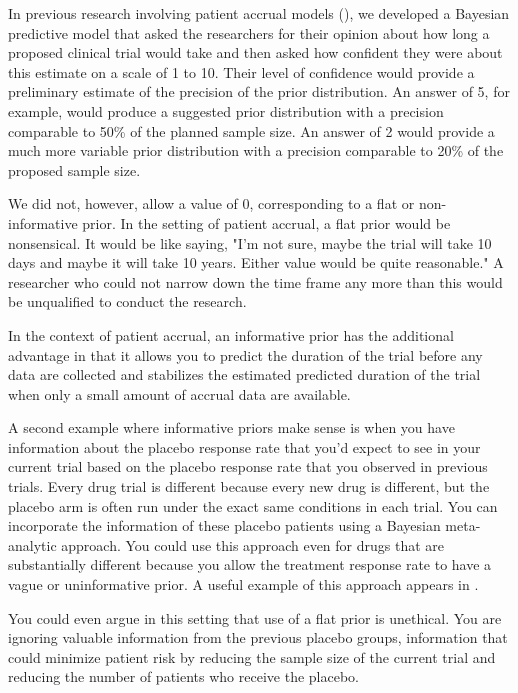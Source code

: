 \documentclass[12pt]{article}
\begin{document}
In previous research involving patient accrual models (\cite{gajewski08}), we developed a Bayesian predictive model that asked the researchers for their opinion about how long a proposed clinical trial would take and then asked how confident they were about this estimate on a scale of 1 to 10. Their level of confidence would provide a preliminary estimate of the precision of the prior distribution. An answer of 5, for example, would produce a suggested prior distribution with a precision comparable to 50\% of the planned sample size. An answer of 2 would provide a much more variable prior distribution with a precision comparable to 20\% of the proposed sample size.

We did not, however, allow a value of 0, corresponding to a flat or non-informative prior. In the setting of patient accrual, a flat prior would be nonsensical. It would be like saying, "I'm not sure, maybe the trial will take 10 days and maybe it will take 10 years. Either value would be quite reasonable." A researcher who could not narrow down the time frame any more than this would be unqualified to conduct the research.

In the context of patient accrual, an informative prior has the additional advantage in that it allows you to predict the duration of the trial before any data are collected and stabilizes the estimated predicted duration of the trial when only a small amount of accrual data are available.

A second example where informative priors make sense is when you have information about the placebo response rate that you'd expect to see in your current trial based on the placebo response rate that you observed in previous trials. Every drug trial is different because every new drug is different, but the placebo arm is often run under the exact same conditions in each trial. You can incorporate the information of these placebo patients using a Bayesian meta-analytic approach. You could use this approach even for drugs that are substantially different because you allow the treatment response rate to have a vague or uninformative prior. A useful example of this approach appears in \cite{walley15}.

You could even argue in this setting that use of a flat prior is unethical. You are ignoring valuable information from the previous placebo groups, information that could minimize patient risk by reducing the sample size of the current trial and reducing the number of patients who receive the placebo.
\end{document}
